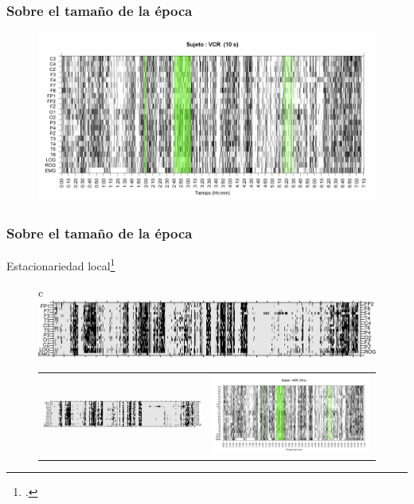 \documentclass[serif,mathserif,professionalfont]{beamer}
\begin{document}

\begin{frame}\frametitle{Sobre el tama\~no de la \'epoca}
\begin{figure}
\centering
\includegraphics[width=0.9\linewidth]
{./img_ejemplos/VCNNS1_est_10.png} 
\end{figure}
\end{frame}


\begin{frame}\frametitle{Sobre el tama\~no de la \'epoca}
{\small Estacionariedad local\footcite{Cohen77}}
\begin{figure}
\centering
\begin{tabular}{c}
\includegraphics[width=0.4\linewidth]
{./img_ejemplos/VCNNS1_est_30.png} \\
\begin{tabular}{cc}
\includegraphics[width=0.4\linewidth]
{./img_ejemplos/VCNNS1_est_60.png} 
&
\includegraphics[width=0.4\linewidth]
{./img_ejemplos/VCNNS1_est_10.png} 
\end{tabular}
\end{tabular}
\end{figure}
\end{frame}
\end{document}

